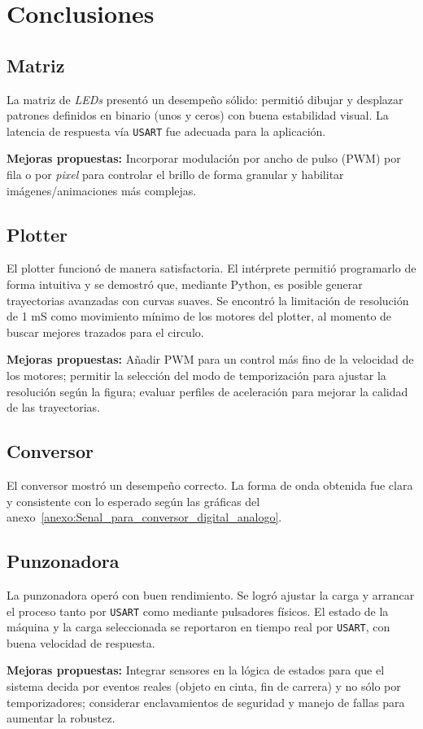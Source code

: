 \section{Conclusiones}

\subsection{Matriz}
La matriz de \textit{LEDs} presentó un desempeño sólido: permitió dibujar y desplazar patrones definidos en binario (unos y ceros) con buena estabilidad visual. La latencia de respuesta vía \texttt{USART} fue adecuada para la aplicación. 

\textbf{Mejoras propuestas:} Incorporar modulación por ancho de pulso (PWM) por fila o por \textit{pixel} para controlar el brillo de forma granular y habilitar imágenes/animaciones más complejas.

\subsection{Plotter}
El plotter funcionó de manera satisfactoria. El intérprete permitió programarlo de forma intuitiva y se demostró que, mediante Python, es posible generar trayectorias avanzadas con curvas suaves. Se encontró la limitación de resolución de 1 mS como movimiento mínimo de los motores del plotter, al momento de buscar mejores trazados para el circulo.

\textbf{Mejoras propuestas:} Añadir PWM para un control más fino de la velocidad de los motores; permitir la selección del modo de temporización para ajustar la resolución según la figura; evaluar perfiles de aceleración para mejorar la calidad de las trayectorias.

\subsection{Conversor}
El conversor mostró un desempeño correcto. La forma de onda obtenida fue clara y consistente con lo esperado según las gráficas del anexo~\ref{anexo:Senal_para_conversor_digital_analogo}. 

\subsection{Punzonadora}
La punzonadora operó con buen rendimiento. Se logró ajustar la carga y arrancar el proceso tanto por \texttt{USART} como mediante pulsadores físicos. El estado de la máquina y la carga seleccionada se reportaron en tiempo real por \texttt{USART}, con buena velocidad de respuesta.

\textbf{Mejoras propuestas:} Integrar sensores en la lógica de estados para que el sistema decida por eventos reales (objeto en cinta, fin de carrera) y no sólo por temporizadores; considerar enclavamientos de seguridad y manejo de fallas para aumentar la robustez.

